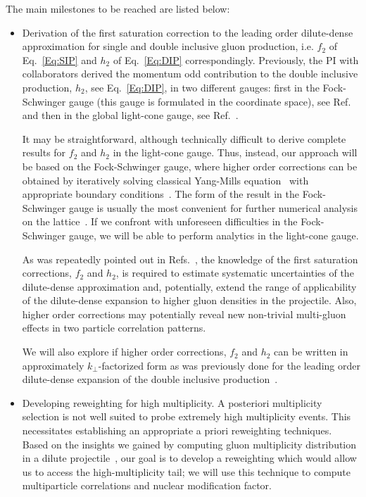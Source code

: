 		The main milestones to be reached are listed below:
		\begin{itemize}
			\item Derivation of the first saturation correction to the leading order 
				dilute-dense approximation for single and double 
				inclusive gluon production, i.e. $f_2$ of Eq.~\eqref{Eq:SIP} and $h_2$  of Eq.~\eqref{Eq:DIP} correspondingly. 
				Previously, the PI with collaborators
				derived the momentum odd contribution to the double inclusive production, $h_2$, see Eq.~\eqref{Eq:DIP}, 
				in two different gauges: first in  the Fock-Schwinger gauge (this gauge is formulated in the coordinate space), see Ref.~\cite{McLerran:2016snu} and 
				then in the global light-cone gauge, see Ref.~\cite{Kovchegov:2018jun}.


				It may be straightforward, although technically difficult to derive complete 
				results for  $f_2$ and $h_2$ in the light-cone gauge. Thus, instead, 
				our approach will be based on the Fock-Schwinger gauge, where higher order corrections 
				can be obtained by iteratively solving classical Yang-Mills equation~\cite{Dumitru:2001ux,McLerran:2016snu}
				with appropriate boundary conditions~\cite{Kovner:1995ts}.
				The form of the result in the Fock-Schwinger gauge is usually the most convenient for 
				further numerical analysis on the lattice~\cite{Kovchegov:2018jun}.
				If we confront with unforeseen difficulties in the Fock-Schwinger gauge,
				we will be able to perform analytics in the light-cone gauge.  


				As was repeatedly pointed out  in Refs.~\cite{Mace:2018vwq,Mace:2018yvl}, the knowledge of the first saturation corrections, 
				$f_2$ and $h_2$, is required to estimate systematic uncertainties of the dilute-dense 
				approximation and, potentially, extend the range of applicability of the dilute-dense expansion to higher 
				gluon densities in the projectile. Also, higher order corrections may potentially reveal new non-trivial multi-gluon
				effects in two particle correlation patterns.  
			
				We will also  explore if higher order corrections, $f_2$ and $h_2$ can be written in approximately 
				$k_\perp$-factorized form as was previously done for the leading order dilute-dense expansion 
				of the double inclusive production~\cite{Kovchegov:2013ewa}.

			\item Developing reweighting  for high multiplicity.  A posteriori multiplicity 
				selection is not well suited to probe extremely high multiplicity events. This necessitates 
				establishing an appropriate a priori reweighting
				techniques. Based on the insights we gained by computing gluon multiplicity distribution
				in a dilute  projectile~\cite{Dumitru:2017cwt,Dumitru:2017ftq,Dumitru:2018iko}, our  goal 
				is to  develop a reweighting which would  allow us to access the
				high-multiplicity tail; we will use this technique to compute multiparticle correlations
				and nuclear modification factor.  


\end{itemize}
